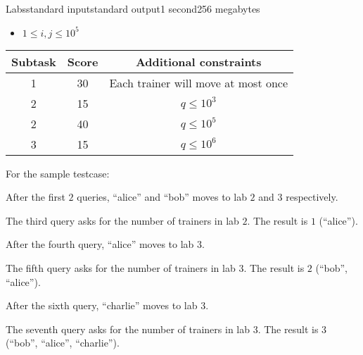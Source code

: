 \begin{problem}{Labs}{standard input}{standard output}{1 second}{256 megabytes}
\begin{itemize}
\item $1 \leq i, j \leq 10^5$
\end{itemize}


\begin{center}
\begin{tabular}{|c|c|c|} 
\hline
\textbf{Subtask} & \textbf{Score} & \textbf{Additional constraints} \\
\hline
1 & 30 & Each trainer will move at most once \\ 
\hline
2 & 15 & $q \leq 10^3$ \\
\hline
2 & 40 & $q \leq 10^5$ \\ 
\hline
3 & 15 & $q \leq 10^6$ \\ 
\hline
\end{tabular}
\end{center}


\Example

\begin{example}
%
\end{example}

\Note
For the sample testcase:

After the first $2$ queries, ``alice'' and ``bob'' moves to lab $2$ and $3$ respectively.

The third query asks for the number of trainers in lab $2$. The result is $1$ (``alice'').

After the fourth query, ``alice'' moves to lab $3$.

The fifth query asks for the number of trainers in lab $3$. The result is $2$ (``bob'', ``alice'').

After the sixth query, ``charlie'' moves to lab 3.

The seventh query asks for the number of trainers in lab 3. The result is $3$ (``bob'', ``alice'', ``charlie'').

\end{problem}

